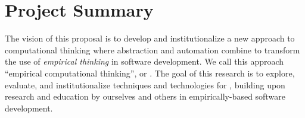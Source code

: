 
\section*{Project Summary}
\renewcommand{\thepage} {A--\arabic{page}}






  The vision of this proposal is to develop and
institutionalize a new approach to computational thinking where abstraction
and automation combine to transform the use of {\em empirical thinking} in
software development.  We call this approach ``empirical computational
thinking'', or \eCT.  The goal of this research is to explore, evaluate,
and institutionalize techniques and technologies for \eCT, building upon
research and education by ourselves and others in empirically-based
software development.

